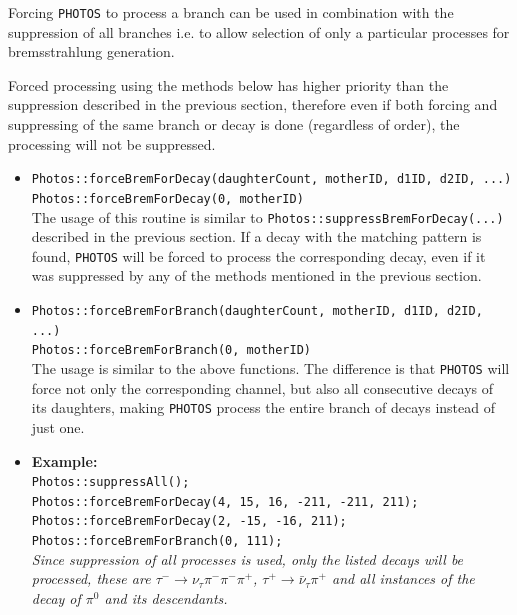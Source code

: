 \documentclass[]{Photos_interface_design}
\begin{document}
Forcing {\tt PHOTOS} to process a branch can be used in combination with
the suppression of all branches i.e. to allow selection of only a particular
processes for bremsstrahlung generation.

Forced processing using the methods below has higher priority than the suppression described
in the previous section, therefore even if both forcing and suppressing of the same
branch or decay is done (regardless of order), the processing will not be
suppressed.

\begin{itemize}

 \item {\tt Photos::forceBremForDecay(daughterCount, motherID, d1ID, d2ID, ...)} \hfill \\
       {\tt Photos::forceBremForDecay(0, motherID)} \hfill \\
       The usage of this routine is similar to {\tt Photos::suppressBremForDecay(...)}
	   described in the previous section. If a decay with the matching pattern is found,
	   {\tt PHOTOS} will be forced to process the corresponding decay, even if it was suppressed
	   by any of the methods mentioned in the previous section.
 \item {\tt Photos::forceBremForBranch(daughterCount, motherID, d1ID, d2ID, ...)} \hfill \\
       {\tt Photos::forceBremForBranch(0, motherID)} \hfill \\
       The usage is similar to the above functions. The difference is
	   that {\tt PHOTOS} will force not only the corresponding channel,
	   but also all consecutive decays of its daughters, making {\tt PHOTOS} process the entire branch
	   of decays instead of just one.
 \item \textbf{Example:} \hfill \\
{\tt Photos::suppressAll(); } \\
{\tt Photos::forceBremForDecay(4, 15, 16, -211, -211, 211); } \\
{\tt Photos::forceBremForDecay(2, -15, -16, 211); } \\
{\tt Photos::forceBremForBranch(0, 111); } \\
\emph{Since suppression of all processes is used, only the listed decays will be processed,
      these are $\tau^- \rightarrow \nu_\tau \pi^- \pi^- \pi^+$, $\tau^+ \rightarrow \bar \nu_\tau \pi^+$
      and all instances of the decay of $\pi^0$ and its descendants.}
\end{itemize}
\end{document}
